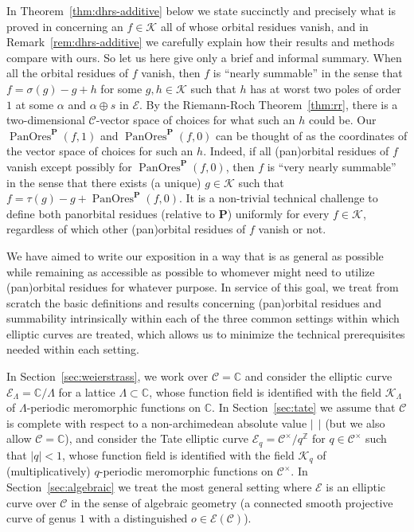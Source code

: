 \documentclass[preprint,12pt]{elsarticle}
\numberwithin{equation}{section} %
\theoremstyle{theorem}
\theoremstyle{definition}
\newcommand{\Cq}{\mathcal{C}} %
\newcommand{\Ca}{\mathcal{C}} %
\newcommand{\bk}{\mathcal{K}} %
\newcommand{\bkl}{\bk_{\Lambda}} %
\newcommand{\bkq}{\bk_{q}} %
\newcommand{\ec}{\mathcal{E}} %
\newcommand{\idec}{{o}} %
\newcommand{\ecl}{\ec_{\Lambda}} %
\newcommand{\ecq}{\ec_{q}}
\newcommand{\C}{\mathbb{C}} %
\newcommand{\Z}{\mathbb{Z}} %
\DeclareMathOperator{\pano}{PanOres}
\begin{document}
In Theorem~\ref{thm:dhrs-additive} below we state succinctly and precisely what is proved in \cite{Dreyfus2018} concerning an $f\in\bk$ all of whose orbital residues vanish, and in Remark~\ref{rem:dhrs-additive} we carefully explain how their results and methods compare with ours. So let us here give only a brief and informal summary. When all the orbital residues of $f$ vanish, then $f$ is ``nearly summable'' in the sense that $f=\sigma(g)-g+h$ for some $g,h\in\bk$ such that $h$ has at worst two poles of order $1$ at some $\alpha$ and $\alpha\oplus s$ in $\ec$. By the Riemann-Roch Theorem~\ref{thm:rr}, there is a two-dimensional $\Ca$-vector space of choices for what such an $h$ could be. Our $\pano^\mathbf{P}(f,1)$ and $\pano^\mathbf{P}(f,0)$ can be thought of as the coordinates of the vector space of choices for such an $h$. Indeed, if all (pan)orbital residues of $f$ vanish except possibly for $\pano^\mathbf{P}(f,0)$, then $f$ is ``very nearly summable'' in the sense that there exists (a unique) $g\in\bk$ such that $f=\tau(g)-g+\pano^\mathbf{P}(f,0)$. It is a non-trivial technical challenge to define both panorbital residues (relative to $\mathbf{P}$) uniformly for every $f\in\bk$, regardless of which other (pan)orbital residues of $f$ vanish or not.

We have aimed to write our exposition in a way that is as general as possible while remaining as accessible as possible to whomever might need to utilize (pan)orbital residues for whatever purpose. In service of this goal, we treat from scratch the basic definitions and results concerning (pan)orbital residues and summability intrinsically within each of the three common settings within which elliptic curves are treated, which allows us to minimize the technical prerequisites needed within each setting.

In Section~\ref{sec:weierstrass}, we work over $\Ca=\C$ and consider the elliptic curve $\ecl=\C/\Lambda$ for a lattice $\Lambda\subset \C$, whose function field is identified with the field $\bkl$ of $\Lambda$-periodic meromorphic functions on $\C$. In Section~\ref{sec:tate} we assume that $\Ca$ is complete with respect to a non-archimedean absolute value $| \ \ |$ (but we also allow $\Ca=\C$), and consider the Tate elliptic curve $\ecq=\Cq^\times/q^\Z$ for $q\in\Cq^\times$ such that $|q|<1$, whose function field is identified with the field $\bkq$ of (multiplicatively) $q$-periodic meromorphic functions on $\Cq^\times$. In Section~\ref{sec:algebraic} we treat the most general setting where $\ec$ is an elliptic curve over $\Ca$ in the sense of algebraic geometry (a connected smooth projective curve of genus $1$ with a distinguished $\idec\in\ec(\Ca)$). 
\end{document}
